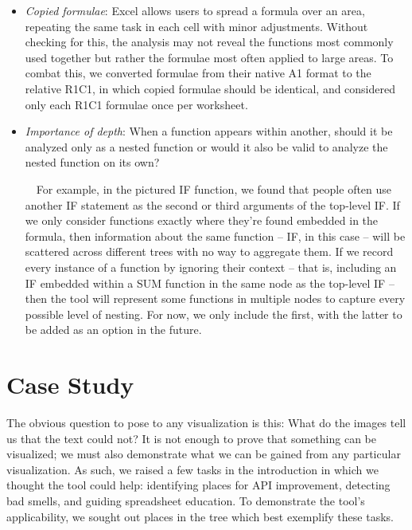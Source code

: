 \documentclass[conference]{IEEEtran}
\begin{document}
\begin{itemize}
		\item \textit{Copied formulae}: Excel allows users to spread a formula over an
		area, repeating the same task in each cell with minor adjustments. Without
		checking for this, the analysis may not reveal the functions most commonly
		used together but rather the formulae most often applied to large areas. To
		combat this, we converted formulae from their native A1 format to the relative
		R1C1, in which copied formulae should be identical, and considered only each
		R1C1 formulae once per worksheet.
		
		\item \textit{Importance of depth}: When a function appears within another,
		should it be analyzed only as a nested function or would it also be valid to
		analyze the nested function on its own? \par
		
		\ \ For example, in the pictured IF function, we found that people often use
		another IF statement as the second or third arguments of the top-level IF. If
		we only consider functions exactly where they're found embedded in the
		formula, then information about the same function -- IF, in this case -- will
		be scattered across different trees with no way to aggregate them. If we
		record every instance of a function by ignoring their context -- that is,
		including an IF embedded within a SUM function in the same node as the
		top-level IF -- then the tool will represent some functions in multiple nodes
		to capture every possible level of nesting. For now, we only include the
		first, with the latter to be added as an option in the future.
		
	\end{itemize}
	
	\section{Case Study} The obvious question to pose to any visualization is this:
	What do the images tell us that the text could not? It is not enough to
	prove that something can be visualized; we must also demonstrate what
	we can be gained from any particular visualization. As such, we raised a few
	tasks in the introduction in which we thought the tool could help: identifying
	places for API improvement, detecting bad smells, and guiding spreadsheet education. To demonstrate the tool's
	applicability, we sought out places in the tree which best exemplify
	these tasks.
	
\end{document}
